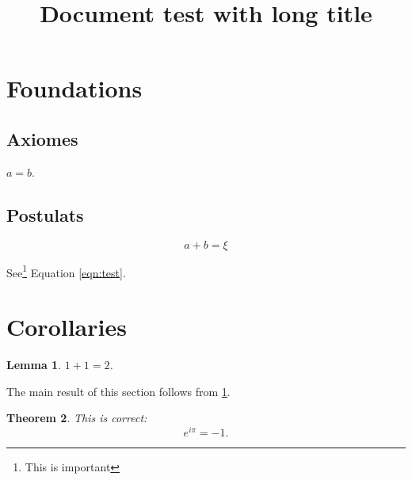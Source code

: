 \documentclass[a4paper]{article}
\title{Document test with long title}
\newtheorem{thm}{Theorem}
\newtheorem{lem}[thm]{Lemma}
\begin{document}
\section{Foundations}
\subsection{Axiomes}

$a = b$.

\subsection{Postulats}
\begin{equation}
\label{eqn:test}
a+b = ξ
\end{equation}

See\footnote{This is important} Equation \ref{eqn:test}.

\section{Corollaries}

\begin{lem}
	\label{lem1}
	$1 + 1 = 2$.
\end{lem}

The main result of this section follows from \ref{lem1}.

\begin{thm}
This is correct:
\[
	e^{i\pi} = -1.
\]
\end{thm}
\end{document}
